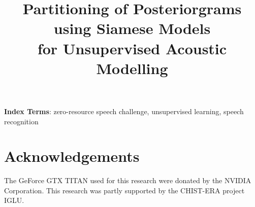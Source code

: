 \documentclass[a4paper]{article}
\title{Partitioning of Posteriorgrams using Siamese Models \\ for Unsupervised Acoustic Modelling}
\begin{document}
\maketitle
% 
\begin{abstract}

\end{abstract}
\noindent\textbf{Index Terms}: zero-resource speech challenge, unsupervised learning, speech recognition







\section{Acknowledgements}
The GeForce GTX TITAN used for this research were donated by the NVIDIA Corporation. This research was partly supported by the CHIST-ERA project IGLU.

\clearpage


\printbibliography[heading=bibnumbered]
%

%
\end{document}
